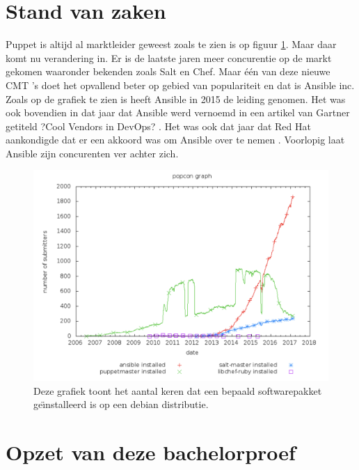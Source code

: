 
\section{Stand van zaken}
\label{sec:stand-van-zaken}


Puppet is altijd al marktleider geweest zoals te zien is op figuur \ref{fig:popcon_everybody}. Maar daar komt nu verandering in. Er is de laatste jaren meer concurentie op de markt gekomen waaronder bekenden zoals Salt en Chef. 
Maar \'e\'en van deze nieuwe CMT 's doet het opvallend beter op gebied van populariteit en dat is Ansible inc. Zoals op de grafiek te zien is heeft Ansible in 2015 de leiding genomen. Het was ook bovendien in dat jaar dat Ansible werd vernoemd in een artikel van Gartner getiteld ?Cool Vendors in DevOps? \autocite{coolvendors}. Het was ook dat jaar dat Red Hat aankondigde dat er een akkoord was om Ansible over te nemen \autocite{redhatovername}. Voorlopig laat Ansible zijn concurenten ver achter zich.

\begin{figure}
  \includegraphics[width=\linewidth]{img/popcon_everybody.png}
  \caption{Deze grafiek toont het aantal keren dat een bepaald softwarepakket ge\"{\i}nstalleerd is op een debian distributie. \autocite{popcon}}
  \label{fig:popcon_everybody}
\end{figure}



\section{Opzet van deze bachelorproef}
\label{sec:opzet-bachelorproef}

